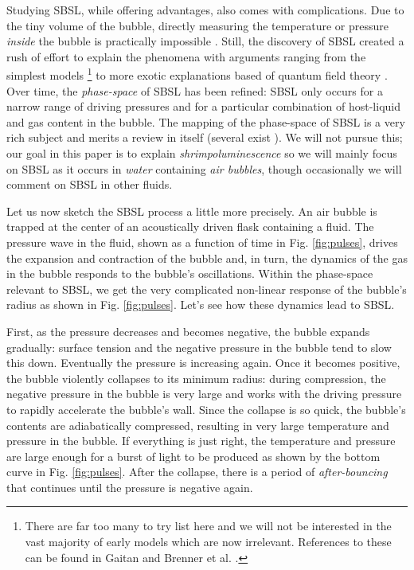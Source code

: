 \documentclass[rmp,aps,nofootinbib,superscriptaddress,floatfix]{revtex4-2}
\begin{document}
Studying SBSL, while offering advantages, also comes with complications. Due to the tiny volume of the bubble, directly measuring the temperature or pressure \emph{inside} the bubble is practically impossible \cite{suslick2008inside}. Still, the discovery of SBSL created a rush of effort to explain the phenomena with arguments ranging from the simplest models \footnote{There are far too many to try list here and we will not be interested in the vast majority of early models which are now irrelevant. References to these can be found in Gaitan \cite{gaitan1990experimental} and Brenner et al. \cite{brenner2002single}.} to more exotic explanations based of quantum field theory \cite{schwinger1993casimir,eberlein1996sonoluminescence,liberati2000sonoluminescence}. Over time, the \emph{phase-space} of SBSL has been refined: SBSL only occurs for a narrow range of driving pressures and for a particular combination of host-liquid and gas content in the bubble. The mapping of the phase-space of SBSL is a very rich subject and merits a review in itself (several exist \cite{brenner2002single,yasui2018acoustic}). We will not pursue this; our goal in this paper is to explain \emph{shrimpoluminescence} so we will mainly focus on SBSL as it occurs in \emph{water} containing \emph{air bubbles}, though occasionally we will comment on SBSL in other fluids. 

Let us now sketch the SBSL process a little more precisely. An air bubble is trapped at the center of an acoustically driven flask containing a fluid. The pressure wave in the fluid, shown as a function of time in Fig. \ref{fig:pulses}, drives the expansion and contraction of the bubble and, in turn, the dynamics of the gas in the bubble responds to the bubble's oscillations. Within the phase-space relevant to SBSL, we get the very complicated non-linear response of the bubble's radius as shown in Fig. \ref{fig:pulses}. Let's see how these dynamics lead to SBSL.

First, as the pressure decreases and becomes negative, the bubble expands gradually: surface tension and the negative pressure in the bubble tend to slow this down. Eventually the pressure is increasing again. Once it becomes positive, the bubble violently collapses to its minimum radius: during compression, the negative pressure in the bubble is very large and works with the driving pressure to rapidly accelerate the bubble's wall. Since the collapse is so quick, the bubble's contents are adiabatically compressed, resulting in very large temperature and pressure in the bubble. If everything is just right, the temperature and pressure are large enough for a burst of light to be produced as shown by the bottom curve in Fig. \ref{fig:pulses}. After the collapse, there is a period of \emph{after-bouncing} that continues until the pressure is negative again. 
\end{document}
